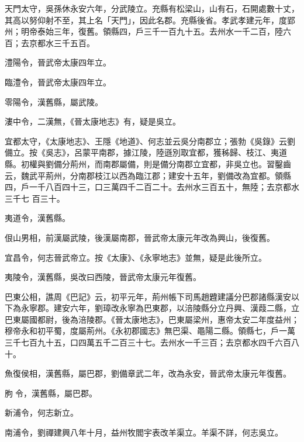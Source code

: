 \begin{pinyinscope}
 天門太守，吳孫休永安六年，分武陵立。充縣有松梁山，山有石，石開處數十丈，其高以努仰射不至，其上名「天門」，因此名郡。充縣後省。孝武孝建元年，度郢州；明帝泰始三年，復舊。領縣四，戶三千一百九十五。去州水一千二百，陸六百；去京都水三千五百。



 澧陽令，晉武帝太康四年立。



 臨澧令，晉武帝太康四年立。



 零陽令，漢舊縣，屬武陵。



 漊中令，二漢無，《晉太康地志》有，疑是吳立。



 宜都太守，《太康地志》、王隱《地道》、何志並云吳分南郡立；張勃《吳錄》云劉備立。按《吳志》，呂蒙平南郡，據江陵，陸遜別取宜都，獲秭歸、枝江、夷道縣。初權與劉備分荊州，而南郡屬備，則是備分南郡立宜都，非吳立也。習鑿齒云，魏武平荊州，分南郡枝江以西為臨江郡；建安十五年，劉備改為宜都。領縣四，戶一千八百四十三，口三萬四千二百二十。去州水三百五十，無陸；去京都水三千七
 百三十。



 夷道令，漢舊縣。



 佷山男相，前漢屬武陵，後漢屬南郡，晉武帝太康元年改為興山，後復舊。



 宜昌令，何志晉武帝立。按《太康》、《永寧地志》並無，疑是此後所立。



 夷陵令，漢舊縣，吳改曰西陵，晉武帝太康元年復舊。



 巴東公相，譙周《巴記》云，初平元年，荊州帳下司馬趙韙建議分巴郡諸縣漢安以下為永寧郡。建安六年，劉璋改永寧為巴東郡，以涪陵縣分立丹興、漢葭二縣，立巴東屬國都尉，後為涪陵郡。《晉太康地志》，巴東屬梁州，惠帝太安二年度益州；穆帝永和初平蜀，度屬荊州。《永初郡國志》無巴渠、黽陽二縣。領縣七，戶一萬三千七百九十五，口四萬五千二百三十七。去州水一千三百；去京都水四千六百八十。



 魚復侯相，漢舊縣，屬巴郡，劉備章武二年，改為永安，晉武帝太康元年復舊。



 朐令，漢舊縣，屬巴郡。



 新浦令，何志新立。



 南浦令，劉禪建興八年十月，益州牧閻宇表改羊渠立。羊渠不詳，何志吳立。




\end{pinyinscope}
